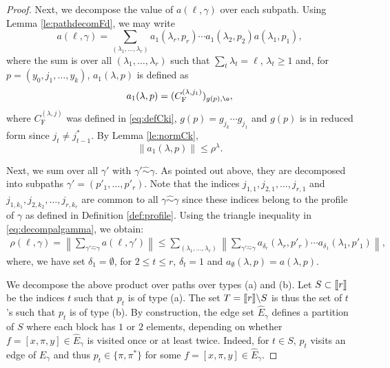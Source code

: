\documentclass[11pt]{article}
\renewcommand{\star}{{\mathrm{F}}}
\newcommand{\NRM}[1]{{{\left\| #1\right\|}}} %
\newcommand{\1}{1\!\!{\sf I}}
\newcommand{\INT}[1]{{{\left[\hspace{-1.4pt}\left[#1\right]\hspace{-1.4pt}\right]}}}
\begin{document}
\begin{proof}
Next, we decompose the value of $a(\ell,\gamma)$ over each subpath. Using Lemma \ref{le:pathdecomFd}, we may write 
\begin{equation}\label{eq:decompalgamma}
a(\ell,\gamma) =  \sum_{(\lambda_1, \ldots ,\lambda_r) } a_{1}(\lambda_r,p_r) \cdots  a_{1}(\lambda_2,p_2) a(\lambda_1,p_1),
\end{equation}
where the sum is over all $(\lambda_1,\ldots,\lambda_r)$ such that $\sum_{t} \lambda_t = \ell$, $\lambda_t \geq 1$ and, for $p = (y_0,j_1,\ldots,y_k)$, $a_1(\lambda,p)$ is defined as
\begin{equation}\label{eq:defAi} 
a_1 (\lambda,p) =  (C_\star^{(\lambda,j_1)} )_{g(p) , \o },
\end{equation}
where $C^{(\lambda,j)}_\star$ was defined in \eqref{eq:defCki}, $g(p) = g_{j_k}\cdots g_{j_1}$ and $g(p)$ is in reduced form since $j_t \ne j_{t-1}^*$.   By Lemma \ref{le:normCk},
\begin{equation}\label{eq:defAinrm} 
\| a_1 (\lambda,p) \| \leq \rho^{\lambda}.
\end{equation} 

Next, we sum over all $\gamma'$ with $\gamma' \hat \sim \gamma$. As pointed out above, they are decomposed into subpaths $\gamma '= (p'_1,\ldots,p'_r)$. Note that the indices $j_{1,1},j_{2,1}, \ldots, j_{r,1}$ and $j_{1,k_1},j_{2,k_2},\ldots,j_{r,k_{r}}$ are common to all $\gamma \hat \sim \gamma$ since these indices belong to the profile of $\gamma$ as defined in Definition \ref{def:profile}. Using the triangle inequality in \eqref{eq:decompalgamma}, we obtain:
\begin{eqnarray}
\rho(\ell,\gamma) = \NRM{  \sum_{\gamma' \hat \sim \gamma} a(\ell,\gamma')  }  \leq \sum_{(\lambda_1, \ldots ,\lambda_r) } \NRM{ \sum_{\gamma' \hat \sim \gamma}   a_{\delta_r}(\lambda_r,p'_r)  \cdots  a_{\delta_1}(\lambda_1,p'_1) },\label{eq:nrmsumg}
\end{eqnarray}
where, we have set 
 $\delta_1 = \emptyset$, for $2 \leq t \leq r$, $\delta_t = 1$ and $a_\emptyset (\lambda,p) =a (\lambda,p)$.
 
 
We decompose the above product over paths over types (a) and (b). Let $S \subset \INT{r}$ be the indices $t$ such that $p_t$ is of type (a). The set $T = \INT{r} \backslash S$ is thus the set of $t$'s such that $p_t$ is of type (b). By construction, the edge set $\widehat E_\gamma$ defines a partition of $S$ where each block has $1$ or $2$ elements, depending on whether $f = [x,\pi,y] \in \widehat E_\gamma$ is visited once or at least twice. Indeed, for $t \in S$, $p_t$ visits an edge of $\widehat E_\gamma$ and thus $p_t \in \{\pi,\pi^*\}$ for some $f = [x,\pi,y]\in \widehat E_\gamma$. 



\end{proof}
\end{document}
